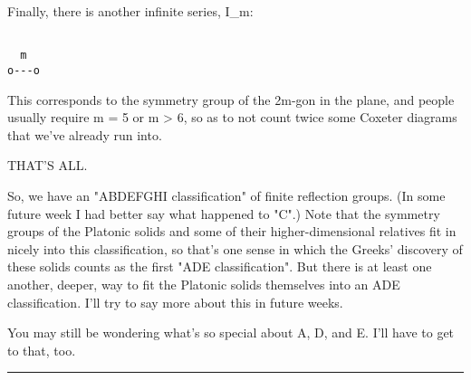 Finally, there is another infinite series, I_{m}:


\begin{verbatim}

  m
o---o
\end{verbatim}
    

This corresponds to the symmetry group of the 2m-gon in the plane,
and people usually require m = 5 or m > 6, so as to not count
twice some Coxeter diagrams that we've already run into.

THAT'S ALL.

So, we have an "ABDEFGHI classification" of finite reflection groups.
(In some future week I had better say what happened to "C".)  Note
that the symmetry groups of the Platonic solids and some of their
higher-dimensional relatives fit in nicely into this classification,
so that's one sense in which the Greeks' discovery of these solids
counts as the first "ADE classification".  But there is at least one
another, deeper, way to fit the Platonic solids themselves into an ADE
classification.  I'll try to say more about this in future weeks.

You may still be wondering what's so special about A, D, and E.  
I'll have to get to that, too.


\par\noindent\rule{\textwidth}{0.4pt}
